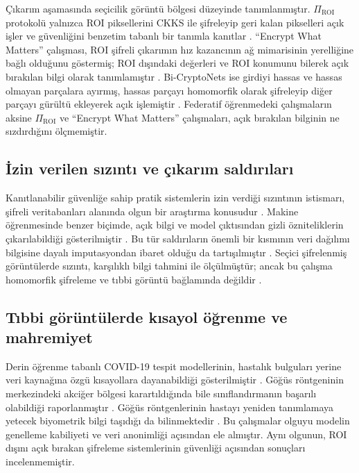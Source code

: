 Çıkarım aşamasında seçicilik görüntü bölgesi düzeyinde tanımlanmıştır. $\Pi_{\mathrm{ROI}}$ protokolü yalnızca ROI piksellerini CKKS ile şifreleyip geri kalan pikselleri açık işler ve güvenliğini benzetim tabanlı bir tanımla kanıtlar \cite{bakas2026roi}. ``Encrypt What Matters'' çalışması, ROI şifreli çıkarımın hız kazancının ağ mimarisinin yerelliğine bağlı olduğunu göstermiş; ROI dışındaki değerleri ve ROI konumunu bilerek açık bırakılan bilgi olarak tanımlamıştır \cite{backour2026encrypt}. Bi-CryptoNets ise girdiyi hassas ve hassas olmayan parçalara ayırmış, hassas parçayı homomorfik olarak şifreleyip diğer parçayı gürültü ekleyerek açık işlemiştir \cite{yuan2024bicryptonets}. Federatif öğrenmedeki çalışmaların aksine $\Pi_{\mathrm{ROI}}$ ve ``Encrypt What Matters'' çalışmaları, açık bırakılan bilginin ne sızdırdığını ölçmemiştir.

\subsection{İzin verilen sızıntı ve çıkarım saldırıları}\label{lit:leakage}

Kanıtlanabilir güvenliğe sahip pratik sistemlerin izin verdiği sızıntının istismarı, şifreli veritabanları alanında olgun bir araştırma konusudur \cite{naveed2015inference,cash2015leakage}. Makine öğrenmesinde benzer biçimde, açık bilgi ve model çıktısından gizli özniteliklerin çıkarılabildiği gösterilmiştir \cite{luo2021feature}. Bu tür saldırıların önemli bir kısmının veri dağılımı bilgisine dayalı imputasyondan ibaret olduğu da tartışılmıştır \cite{jayaraman2022imputation}. Seçici şifrelenmiş görüntülerde sızıntı, karşılıklı bilgi tahmini ile ölçülmüştür; ancak bu çalışma homomorfik şifreleme ve tıbbi görüntü bağlamında değildir \cite{messadi2025selective}.

\subsection{Tıbbi görüntülerde kısayol öğrenme ve mahremiyet}\label{lit:shortcut}

Derin öğrenme tabanlı COVID-19 tespit modellerinin, hastalık bulguları yerine veri kaynağına özgü kısayollara dayanabildiği gösterilmiştir \cite{degrave2021shortcuts}. Göğüs röntgeninin merkezindeki akciğer bölgesi karartıldığında bile sınıflandırmanın başarılı olabildiği raporlanmıştır \cite{maguolo2021critic}. Göğüs röntgenlerinin hastayı yeniden tanımlamaya yetecek biyometrik bilgi taşıdığı da bilinmektedir \cite{packhauser2022reid}. Bu çalışmalar olguyu modelin genelleme kabiliyeti ve veri anonimliği açısından ele almıştır. Aynı olgunun, ROI dışını açık bırakan şifreleme sistemlerinin güvenliği açısından sonuçları incelenmemiştir.

